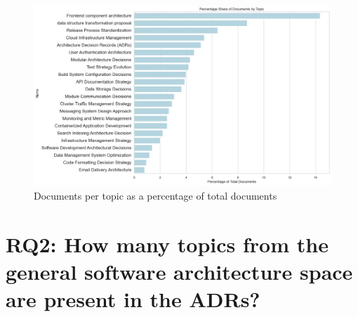         \begin{figure}[H]
            \centering
            \includegraphics[scale=0.4]{figures/percentage_topics.png}
            \caption{Documents per topic as a percentage of total documents}
            \label{fig:docs_per_topic_percentage}
        \end{figure}


    \section{RQ2: How many topics from the general software architecture space are present in the ADRs?}

